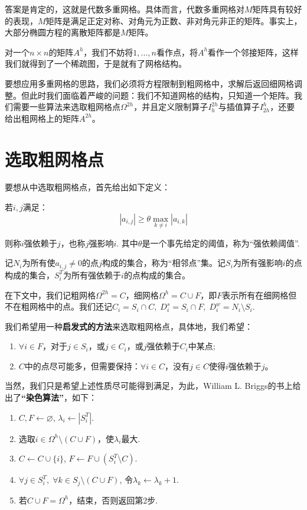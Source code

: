 \documentclass[lang=cn,10pt,bibend=bibtex]{elegantbook}
\begin{document}
答案是肯定的，这就是代数多重网格。具体而言，代数多重网格对$M$矩阵具有较好的表现，$M$矩阵是满足正定对称、对角元为正数、非对角元非正的矩阵。事实上，大部分椭圆方程的离散矩阵都是$M$矩阵。

对一个$n\times n$的矩阵$A^h$，我们不妨将$1,...,n$看作点，将$A^h$看作一个邻接矩阵，这样我们就得到了一个稀疏图，于是就有了网格结构。

要想应用多重网格的思路，我们必须将方程限制到粗网格中，求解后返回细网格调整。但此时我们面临着严峻的问题：我们不知道网格的结构，只知道一个矩阵。我们需要一些算法来选取粗网格点$\Omega^{2h}$，并且定义限制算子$I_{h}^{2h}$与插值算子$I_{2h}^{h}$，还要给出粗网格上的矩阵$A^{2h}$。

\section{选取粗网格点}

要想从中选取粗网格点，首先给出如下定义：

\begin{definition}
  若$i,j$满足：
  \begin{equation}
    |a_{i,j}|\geq \theta\max_{k\neq i}|a_{i,k}|
  \end{equation}

  则称$i$强依赖于$j$，也称$j$强影响$i$. 其中$\theta$是一个事先给定的阈值，称为“强依赖阈值”.

  记$N_i$为所有使$a_{i,j}\neq 0$的点$j$构成的集合，称为“相邻点”集。记$S_i$为所有强影响$i$的点构成的集合，$S_i^T$为所有强依赖于$i$的点构成的集合。
\end{definition}

在下文中，我们记粗网格$\Omega^{2h}=C$，细网格$\Omega^h=C\cup F$，即$F$表示所有在细网格但不在粗网格中的点。我们还记$C_i=S_i\cap C,\;D_i^s=S_i\cap F,\;D_i^w=N_i\setminus S_i$.

我们希望用一种\textbf{启发式的方法}来选取粗网格点，具体地，我们希望：
\begin{enumerate}[(1)]
  \item $\forall i\in F$，对于$j\in S_i$，或$j\in C_i$，或$j$强依赖于$C_i$中某点;
  \item $C$中的点尽可能多，但需要保持：$\forall i\in C$，没有$j\in C$使得$i$强依赖于$j$。
\end{enumerate}

当然，我们只是希望上述性质尽可能得到满足，为此，William L. Briggs的书上给出了\textbf{“染色算法”}，如下：
\begin{enumerate}[1]
  \item $C,F\gets \varnothing$, $\lambda_i\gets |S_i^T|$.
  \item 选取$i\in\Omega^h\setminus(C\cup F)$，使$\lambda_i$最大.
  \item $C\gets C\cup\{i\}$, $F\gets F\cup (S_i^T\setminus C)$.
  \item $\forall j\in S_i^T,\;\forall k\in S_j\setminus(C\cup F)$, 令$\lambda_k\gets \lambda_k+1$.
  \item 若$C\cup F=\Omega^h$，结束，否则返回第2步.
\end{enumerate}
\end{document}
